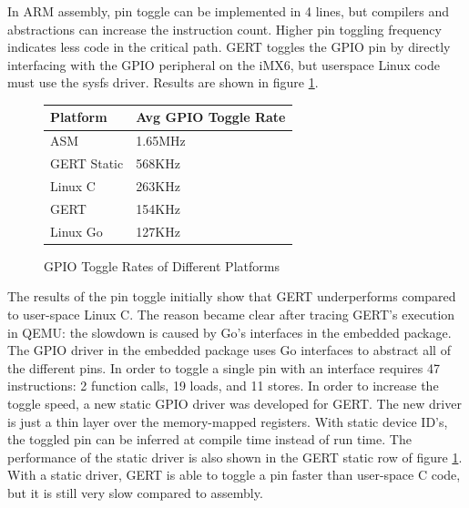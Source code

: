In ARM assembly, pin toggle can be implemented in 4 lines, but compilers and 
abstractions can increase the instruction count. Higher pin
toggling frequency indicates less code in the critical path.
GERT toggles the GPIO pin by directly interfacing with the GPIO
peripheral on the iMX6, but userspace Linux code must use the
sysfs driver.
Results are shown in figure \ref{fig:toggle}.


\begin{figure} [h]
\begin{center}
  \begin{tabular}{ | l | l |}
    \hline
    Platform & Avg GPIO Toggle Rate \\ \hline
    ASM & 1.65MHz \\ \hline
    GERT Static & 568KHz \\ \hline
    Linux C & 263KHz \\ \hline
    GERT & 154KHz \\ \hline
    Linux Go & 127KHz \\
    \hline
  \end{tabular}
\end{center}
  \caption{GPIO Toggle Rates of Different Platforms}  \label{fig:toggle}
\end{figure}


The results of the pin toggle initially show that GERT underperforms compared to
user-space Linux C. The reason became clear after tracing GERT's execution in QEMU:
the slowdown is caused by Go's interfaces in the embedded package. The GPIO driver
in the embedded package uses Go interfaces to abstract all of the different pins.
In order to toggle a single pin with an interface requires 47 instructions:
2 function calls, 19 loads, and 11 stores. In order to increase the toggle speed,
a new static GPIO driver was developed for GERT. The new driver is just a thin layer
over the memory-mapped registers. With static device ID's, the toggled pin
can be inferred at compile time instead of run time.
The performance of the static driver is also shown in the GERT static row
of figure \ref{fig:toggle}. With a static driver, GERT is able to toggle a
pin faster than user-space C code, but it is still very slow compared to
assembly.

